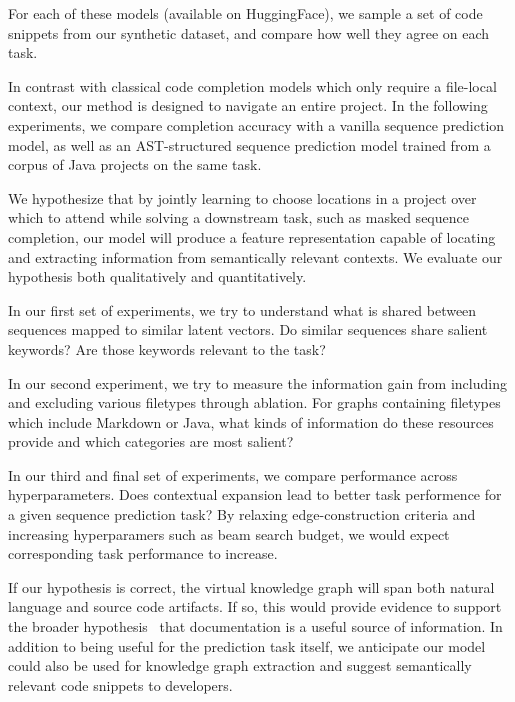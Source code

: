 \documentclass[sigconf]{acmart}
\begin{document}
  For each of these models (available on HuggingFace), we sample a set of code snippets from our synthetic dataset, and compare how well they agree on each task.


  In contrast with classical code completion models which only require a file-local context, our method is designed to navigate an entire project. In the following experiments, we compare completion accuracy with a vanilla sequence prediction model, as well as an AST-structured sequence prediction model trained from a corpus of Java projects on the same task.

  We hypothesize that by jointly learning to choose locations in a project over which to attend while solving a downstream task, such as masked sequence completion, our model will produce a feature representation capable of locating and extracting information from semantically relevant contexts. We evaluate our hypothesis both qualitatively and quantitatively.

  In our first set of experiments, we try to understand what is shared between sequences mapped to similar latent vectors. Do similar sequences share salient keywords? Are those keywords relevant to the task?

  In our second experiment, we try to measure the information gain from including and excluding various filetypes through ablation. For graphs containing filetypes which include Markdown or Java, what kinds of information do these resources provide and which categories are most salient?


  In our third and final set of experiments, we compare performance across hyperparameters. Does contextual expansion lead to better task performence for a given sequence prediction task? By relaxing edge-construction criteria and increasing hyperparamers such as beam search budget, we would expect corresponding task performance to increase.

  If our hypothesis is correct, the virtual knowledge graph will span both natural language and source code artifacts. If so, this would provide evidence to support the broader hypothesis~\citep{guo2017semantically} that documentation is a useful source of information. In addition to being useful for the prediction task itself, we anticipate our model could also be used for knowledge graph extraction and suggest semantically relevant code snippets to developers.
\end{document}

